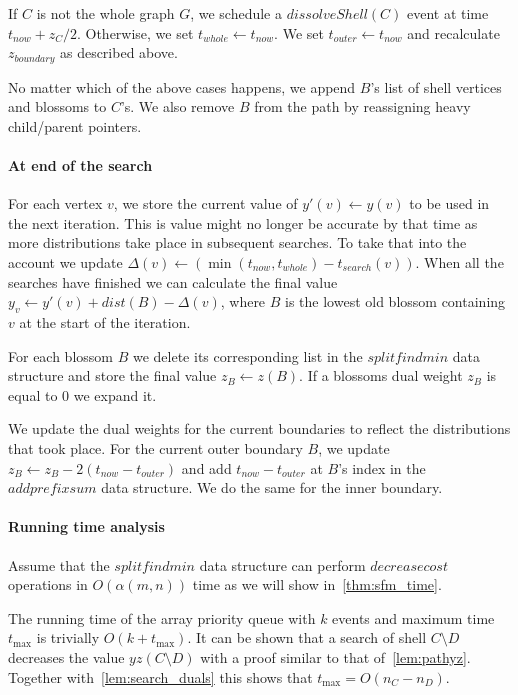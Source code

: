 If $C$ is not the whole graph $G$, we schedule a $dissolveShell(C)$ event at time $t_{now} + z_C / 2$. Otherwise, we set $t_{whole} \gets t_{now}$. We set $t_{outer} \gets t_{now}$ and recalculate $z_{boundary}$ as described above.

No matter which of the above cases happens, we append $B$'s list of shell vertices and blossoms to $C$'s. We also remove $B$ from the path by reassigning heavy child/parent pointers.

\paragraph*{At end of the search} For each vertex $v$, we store the current value of $y'(v) \gets y(v)$ to be used in the next iteration. This is value might no longer be accurate by that time as more distributions take place in subsequent searches. To take that into the account we update $\Delta(v) \gets (\min(t_{now}, t_{whole}) - t_{search}(v))$. When all the searches have finished we can calculate the final value $y_v \gets y'(v) + dist(B) - \Delta(v)$, where $B$ is the lowest old blossom containing $v$ at the start of the iteration.

For each blossom $B$ we delete its corresponding list in the $splitfindmin$ data structure and store the final value $z_B \gets z(B)$. If a blossoms dual weight $z_B$ is equal to $0$ we expand it.

We update the dual weights for the current boundaries to reflect the distributions that took place. For the current outer boundary $B$, we update $z_B \gets z_B - 2(t_{now} - t_{outer})$ and add $t_{now} - t_{outer}$ at $B$'s index in the $addprefixsum$ data structure. We do the same for the inner boundary.

\paragraph*{Running time analysis} Assume that the $splitfindmin$ data structure can perform $decreasecost$ operations in $O(\alpha(m,n))$ time as we will show in~\ref{thm:sfm_time}.

The running time of the array priority queue with $k$ events and maximum time $t_{\max}$ is trivially $O(k + t_{\max})$. It can be shown that a search of shell $C \setminus D$ decreases the value $yz(C \setminus D)$ with a proof similar to that of~\ref{lem:pathyz}. Together with~\ref{lem:search_duals} this shows that $t_{\max} = O(n_C - n_D)$. 

